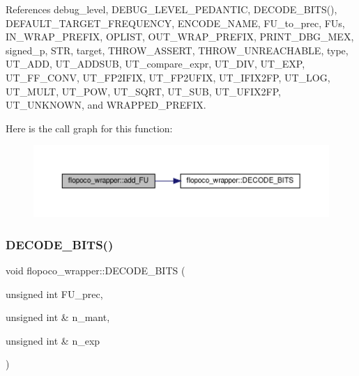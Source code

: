 References debug\+\_\+level, D\+E\+B\+U\+G\+\_\+\+L\+E\+V\+E\+L\+\_\+\+P\+E\+D\+A\+N\+T\+IC, D\+E\+C\+O\+D\+E\+\_\+\+B\+I\+T\+S(), D\+E\+F\+A\+U\+L\+T\+\_\+\+T\+A\+R\+G\+E\+T\+\_\+\+F\+R\+E\+Q\+U\+E\+N\+CY, E\+N\+C\+O\+D\+E\+\_\+\+N\+A\+ME, F\+U\+\_\+to\+\_\+prec, F\+Us, I\+N\+\_\+\+W\+R\+A\+P\+\_\+\+P\+R\+E\+F\+IX, O\+P\+L\+I\+ST, O\+U\+T\+\_\+\+W\+R\+A\+P\+\_\+\+P\+R\+E\+F\+IX, P\+R\+I\+N\+T\+\_\+\+D\+B\+G\+\_\+\+M\+EX, signed\+\_\+p, S\+TR, target, T\+H\+R\+O\+W\+\_\+\+A\+S\+S\+E\+RT, T\+H\+R\+O\+W\+\_\+\+U\+N\+R\+E\+A\+C\+H\+A\+B\+LE, type, U\+T\+\_\+\+A\+DD, U\+T\+\_\+\+A\+D\+D\+S\+UB, U\+T\+\_\+compare\+\_\+expr, U\+T\+\_\+\+D\+IV, U\+T\+\_\+\+E\+XP, U\+T\+\_\+\+F\+F\+\_\+\+C\+O\+NV, U\+T\+\_\+\+F\+P2\+I\+F\+IX, U\+T\+\_\+\+F\+P2\+U\+F\+IX, U\+T\+\_\+\+I\+F\+I\+X2\+FP, U\+T\+\_\+\+L\+OG, U\+T\+\_\+\+M\+U\+LT, U\+T\+\_\+\+P\+OW, U\+T\+\_\+\+S\+Q\+RT, U\+T\+\_\+\+S\+UB, U\+T\+\_\+\+U\+F\+I\+X2\+FP, U\+T\+\_\+\+U\+N\+K\+N\+O\+WN, and W\+R\+A\+P\+P\+E\+D\+\_\+\+P\+R\+E\+F\+IX.

Here is the call graph for this function\+:
\nopagebreak
\begin{figure}[H]
\begin{center}
\leavevmode
\includegraphics[width=350pt]{d7/dbf/classflopoco__wrapper_a1bf6c7e46b20a7db7a71f46f8483637e_cgraph}
\end{center}
\end{figure}
\mbox{\label{classflopoco__wrapper_ab0789242cbc4e02a7fdb1a159441f706}} 
\subsubsection{\texorpdfstring{D\+E\+C\+O\+D\+E\+\_\+\+B\+I\+T\+S()}{DECODE\_BITS()}}
{\footnotesize\ttfamily void flopoco\+\_\+wrapper\+::\+D\+E\+C\+O\+D\+E\+\_\+\+B\+I\+TS (\begin{DoxyParamCaption}\item[{unsigned int}]{F\+U\+\_\+prec,  }\item[{unsigned int \&}]{n\+\_\+mant,  }\item[{unsigned int \&}]{n\+\_\+exp }\end{DoxyParamCaption})\hspace{0.3cm}{\ttfamily [static]}}



